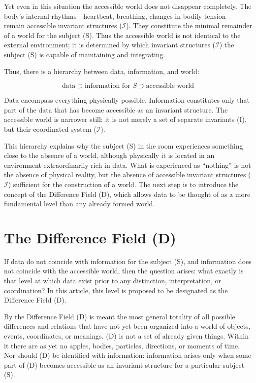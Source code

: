 \documentclass[aps,prd,onecolumn,nofootinbib,superscriptaddress]{revtex4-2}
\begin{document}
Yet even in this situation the accessible world does not disappear completely. The body’s internal rhythms—heartbeat, breathing, changes in bodily tension—remain accessible invariant structures ($\mathcal{I}$). They constitute the minimal remainder of a world for the subject (S). Thus the accessible world is not identical to the external environment; it is determined by which invariant structures ($\mathcal{I}$) the subject (S) is capable of maintaining and integrating.

Thus, there is a hierarchy between data, information, and world:

\[
\text{data} \supset \text{information for } S \supset \text{accessible world}
\]

Data encompass everything physically possible. Information constitutes only that part of the data that has become accessible as an invariant structure. The accessible world is narrower still: it is not merely a set of separate invariants (I), but their coordinated system ($\mathcal{I}$).

This hierarchy explains why the subject (S) in the room experiences something close to the absence of a world, although physically it is located in an environment extraordinarily rich in data. What is experienced as “nothing” is not the absence of physical reality, but the absence of accessible invariant structures ($\mathcal{I}$) sufficient for the construction of a world. The next step is to introduce the concept of the Difference Field (D), which allows data to be thought of as a more fundamental level than any already formed world.

\section{The Difference Field (D)}
If data do not coincide with information for the subject (S), and information does not coincide with the accessible world, then the question arises: what exactly is that level at which data exist prior to any distinction, interpretation, or coordination? In this article, this level is proposed to be designated as the Difference Field (D).

By the Difference Field (D) is meant the most general totality of all possible differences and relations that have not yet been organized into a world of objects, events, coordinates, or meanings. (D) is not a set of already given things. Within it there are as yet no apples, bodies, particles, directions, or moments of time. Nor should (D) be identified with information: information arises only when some part of (D) becomes accessible as an invariant structure for a particular subject (S).
\end{document}
